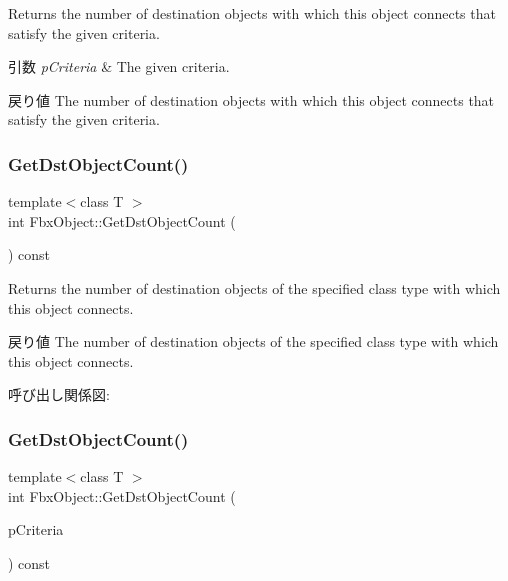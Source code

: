 Returns the number of destination objects with which this object connects that satisfy the given criteria. 
\begin{DoxyParams}{引数}
{\em p\+Criteria} & The given criteria. \\
\hline
\end{DoxyParams}
\begin{DoxyReturn}{戻り値}
The number of destination objects with which this object connects that satisfy the given criteria. 
\end{DoxyReturn}
\mbox{\label{class_fbx_object_a1a642124ddabd14884fc0c85793a5c6d}} 
\subsubsection{\texorpdfstring{Get\+Dst\+Object\+Count()}{GetDstObjectCount()}\hspace{0.1cm}{\footnotesize\ttfamily [3/4]}}
{\footnotesize\ttfamily template$<$class T $>$ \\
int Fbx\+Object\+::\+Get\+Dst\+Object\+Count (\begin{DoxyParamCaption}{ }\end{DoxyParamCaption}) const}

Returns the number of destination objects of the specified class type with which this object connects. \begin{DoxyReturn}{戻り値}
The number of destination objects of the specified class type with which this object connects. 
\end{DoxyReturn}
呼び出し関係図\+:
\mbox{\label{class_fbx_object_a03da9b6768a234550042e0b3a70f081f}} 
\subsubsection{\texorpdfstring{Get\+Dst\+Object\+Count()}{GetDstObjectCount()}\hspace{0.1cm}{\footnotesize\ttfamily [4/4]}}
{\footnotesize\ttfamily template$<$class T $>$ \\
int Fbx\+Object\+::\+Get\+Dst\+Object\+Count (\begin{DoxyParamCaption}\item[{const \hyperlink{class_fbx_criteria}{Fbx\+Criteria} \&}]{p\+Criteria }\end{DoxyParamCaption}) const}

